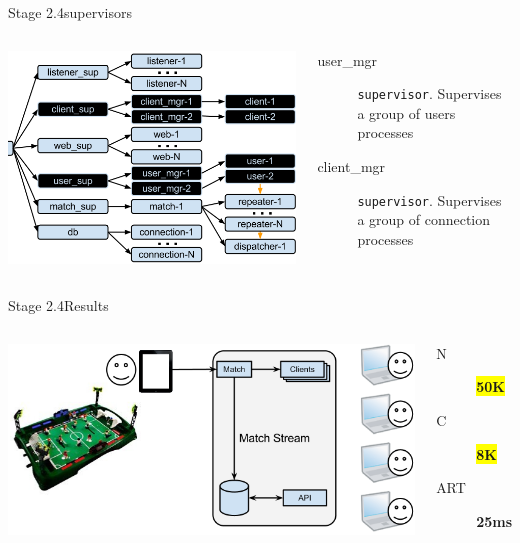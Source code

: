 \documentclass[utf8]{beamer}
\begin{document}
\begin{frame}{Stage 2.4}{supervisors}
	\begin{columns}
			\begin{center}
				\includegraphics[height=.65\textheight]{img/architecture-3-4.png}
			\end{center}
			\begin{description}
				\item[user\_mgr]
					\texttt{supervisor}. Supervises a group of users processes
				\item[client\_mgr]
					\texttt{supervisor}. Supervises a group of connection processes
			\end{description}
	\end{columns}
\end{frame}
\begin{frame}{Stage 2.4}{Results}
	\begin{columns}
		\column{.66\textwidth}
			\includegraphics[top=-1,width=\textwidth]{img/results-1.png}
		\column{.33\textwidth}
			\begin{description}
				\item[N] \textbf{\colorbox{yellow}{\Large 50K}}
				\item[C] \textbf{\colorbox{yellow}{\Large 8K}}
				\item[ART] \textbf{\Large 25ms}
			\end{description}
	\end{columns}
\end{frame}
\end{document}
